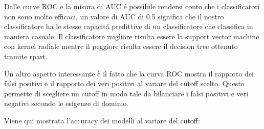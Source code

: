 Dalle curve ROC e la misura di AUC é possibile rendersi conto che i
classificatori non sono molto efficaci, un valore di AUC di 0.5
significa che il nostro classificatore ha le stesse capacitá
predittive di un classificatore che classifica in maniera casuale. Il
classificatore migliore risulta essere la support vector machine con
kernel radiale mentre il peggiore risulta essere il decision tree
ottenuto tramite rpart.

Un altro aspetto interessante è il fatto che la curva ROC mostra il
rapporto dei falsi positivi e il rapporto dei veri positivi al variare
del cutoff scelto. Questo permette di scegliere un cutoff in modo tale
da bilanciare i falsi positivi e veri negativi secondo le esigenze di
dominio.

Viene qui mostrata l'accuracy dei modelli al variare del cutoff:

